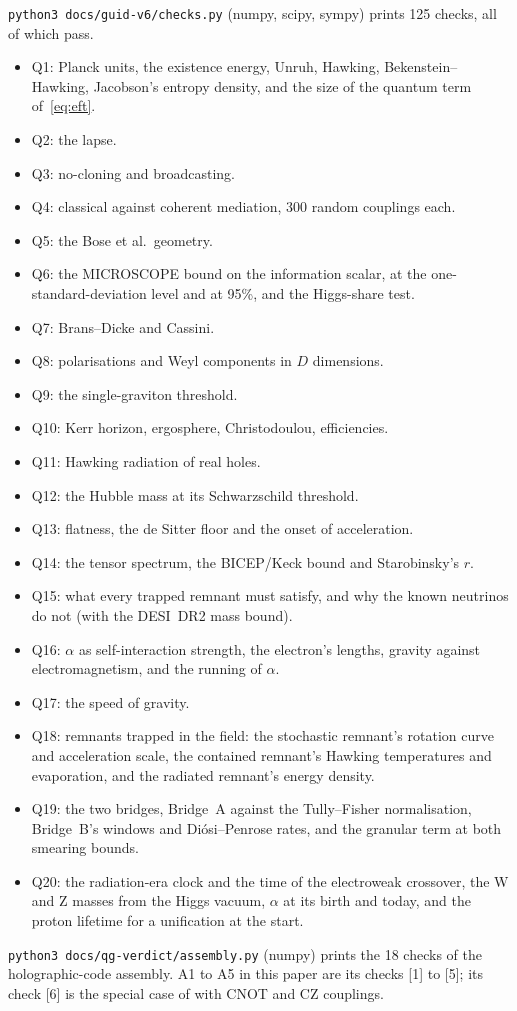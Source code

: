 \texttt{python3 docs/guid-v6/checks.py} (numpy, scipy, sympy) prints 125 checks, all of which pass.
\begin{itemize}[nosep]
\item Q1: Planck units, the existence energy, Unruh, Hawking, Bekenstein--Hawking, Jacobson's entropy density, and the size of the quantum
term of~\eqref{eq:eft}.
\item Q2: the lapse.
\item Q3: no-cloning and broadcasting.
\item Q4: classical against coherent mediation, 300 random couplings each.
\item Q5: the Bose et al.\ geometry.
\item Q6: the MICROSCOPE bound on the information scalar, at the one-standard-deviation level and at 95\%, and the Higgs-share test.
\item Q7: Brans--Dicke and Cassini.
\item Q8: polarisations and Weyl components in $D$ dimensions.
\item Q9: the single-graviton threshold.
\item Q10: Kerr horizon, ergosphere, Christodoulou, efficiencies.
\item Q11: Hawking radiation of real holes.
\item Q12: the Hubble mass at its Schwarzschild threshold.
\item Q13: flatness, the de Sitter floor and the onset of acceleration.
\item Q14: the tensor spectrum, the BICEP/Keck bound and Starobinsky's $r$.
\item Q15: what every trapped remnant must satisfy, and why the known neutrinos do not (with the DESI~DR2 mass bound).
\item Q16: $\alpha$ as self-interaction strength, the electron's lengths, gravity against electromagnetism, and the running of $\alpha$.
\item Q17: the speed of gravity.
\item Q18: remnants trapped in the field: the stochastic remnant's rotation curve and acceleration scale, the contained remnant's Hawking
temperatures and evaporation, and the radiated remnant's energy density.
\item Q19: the two bridges, Bridge~A against the Tully--Fisher normalisation, Bridge~B's windows and Di\'osi--Penrose rates, and the
granular term at both smearing bounds.
\item Q20: the radiation-era clock and the time of the electroweak crossover, the W and Z masses from the Higgs vacuum, $\alpha$ at its
birth and today, and the proton lifetime for a unification at the start.
\end{itemize}
\texttt{python3 docs/qg-verdict/assembly.py} (numpy) prints the 18 checks of the holographic-code assembly. A1 to A5 in this paper are
its checks [1] to [5]; its check [6] is the special case of  with CNOT and CZ couplings.
